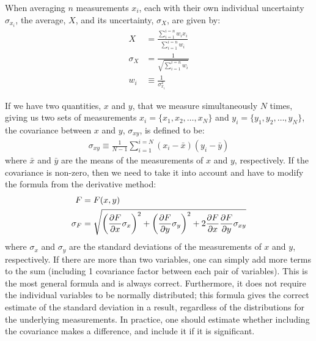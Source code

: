 When averaging $n$ measurements $x_i$, each with their own individual uncertainty $\sigma_{x_i}$, the average, $X$, and its uncertainty, $\sigma_{X}$, are given by:
\begin{align*}
X &= \frac{\sum_{i=1}^{i=n}w_ix_i}{\sum_{i=1}^{i=n}w_i}\\
\sigma_{X} &= \frac{1}{\sqrt{\sum_{i=1}^{i=n}w_i}}\\
w_i&\equiv\frac{1}{\sigma_{x_i}^2}
\end{align*}

If we have two quantities, $x$ and $y$, that we measure simultaneously $N$ times, giving us two sets of measurements  $x_i=\{x_1, x_2,\dots, x_N\}$ and $y_i=\{y_1, y_2,\dots, y_N\}$, the covariance between $x$ and $y$, $\sigma_{xy}$, is defined to be:
\begin{align}
\sigma_{xy}\equiv\frac{1}{N-1}\sum_{i=1}^{i=N}(x_i-\bar x)(y_i-\bar y)
\end{align}
where $\bar x$ and $\bar y$ are the means of the measurements of $x$ and $y$, respectively. If the covariance is non-zero, then we need to take it into account and have to modify the formula from the derivative method:
\begin{align}
F&=F(x,y)\nonumber\\
\sigma_{F} &= \sqrt{\left(\frac{\partial F}{\partial x}\sigma_x\right)^2 + \left(\frac{\partial F}{\partial y} \sigma_y\right)^2+2\frac{\partial F}{\partial x}\frac{\partial F}{\partial y}\sigma_{xy}}
\end{align}
where $\sigma_x$ and $\sigma_y$ are the standard deviations of the measurements of $x$ and $y$, respectively. If there are more than two variables, one can simply add more terms to the sum (including 1 covariance factor between each pair of variables). This is the most general formula and is always correct. Furthermore, it does not require the individual variables to be normally distributed; this formula gives the correct estimate of the standard deviation in a result, regardless of the distributions for the underlying measurements. In practice, one should estimate whether including the covariance makes a difference, and include it if it is significant.
